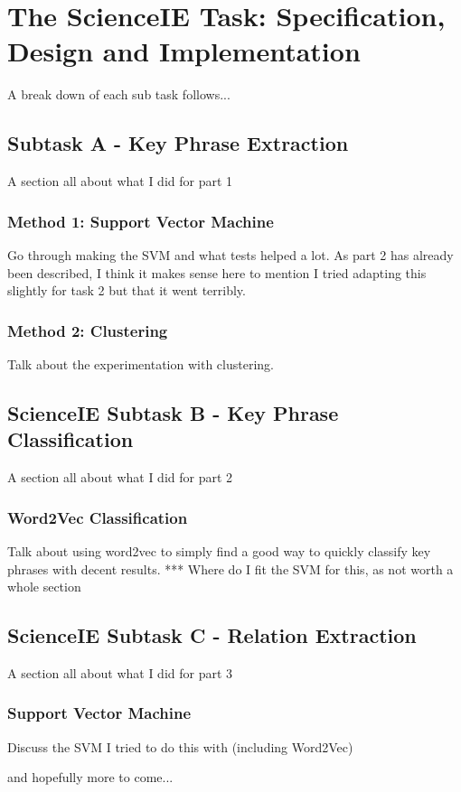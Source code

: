\section{The ScienceIE Task: Specification, Design and Implementation}

A break down of each sub task follows...

\subsection{Subtask A - Key Phrase Extraction}
A section all about what I did for part 1
\subsubsection{Method 1: Support Vector Machine}
Go through making the SVM and what tests helped a lot. 
As part 2 has already been described, I think it makes sense here to mention I tried adapting this slightly for task 2 but that it went terribly.
\subsubsection{Method 2: Clustering}
Talk about the experimentation with clustering.

\subsection{ScienceIE Subtask B - Key Phrase Classification}
A section all about what I did for part 2
\subsubsection{Word2Vec Classification}
Talk about using word2vec to simply find a good way to quickly classify key phrases with decent results.
*** Where do I fit the SVM for this, as not worth a whole section

\subsection{ScienceIE Subtask C - Relation Extraction}
A section all about what I did for part 3
\subsubsection{Support Vector Machine}
Discuss the SVM I tried to do this with (including Word2Vec)

and hopefully more to come...
